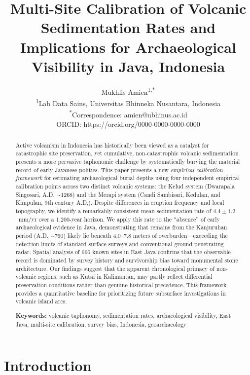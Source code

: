 \documentclass[12pt,letterpaper]{article}
\title{Multi-Site Calibration of Volcanic Sedimentation Rates and Implications for Archaeological Visibility in Java, Indonesia}
\author{
  Mukhlis Amien\textsuperscript{1,*}\\[4pt]
  \small \textsuperscript{1}Lab Data Sains, Universitas Bhinneka Nusantara, Indonesia\\
  \small \textsuperscript{*}Correspondence: amien@ubhinus.ac.id\\
  \small ORCID: https://orcid.org/0000-0000-0000-0000 %
}
\date{}
\begin{document}
\maketitle

\begin{abstract}
Active volcanism in Indonesia has historically been viewed as a catalyst for catastrophic site preservation, yet cumulative, non-catastrophic volcanic sedimentation presents a more pervasive taphonomic challenge by systematically burying the material record of early Javanese polities. This paper presents a new \textit{empirical calibration framework} for estimating archaeological burial depths using four independent empirical calibration points across two distinct volcanic systems: the Kelud system (Dwarapala Singosari, A.D.~\textasciitilde 1268) and the Merapi system (Candi Sambisari, Kedulan, and Kimpulan, 9th century A.D.). Despite differences in eruption frequency and local topography, we identify a remarkably consistent mean sedimentation rate of $4.4 \pm 1.2$~mm/yr over a 1,200-year horizon. We apply this rate to the ``absence'' of early archaeological evidence in Java, demonstrating that remains from the Kanjuruhan period (A.D.~\textasciitilde 760) likely lie beneath 4.0--7.8 meters of overburden---exceeding the detection limits of standard surface surveys and conventional ground-penetrating radar. Spatial analysis of 666 known sites in East Java confirms that the observable record is dominated by survey history and survivorship bias toward monumental stone architecture. Our findings suggest that the apparent chronological primacy of non-volcanic regions, such as Kutai in Kalimantan, may partly reflect differential preservation conditions rather than genuine historical precedence. This framework provides a quantitative baseline for prioritizing future subsurface investigations in volcanic island arcs.

\medskip
\noindent\textbf{Keywords:} volcanic taphonomy, sedimentation rates, archaeological visibility, East Java, multi-site calibration, survey bias, Indonesia, geoarchaeology
\end{abstract}

\section{Introduction}
\end{document}
